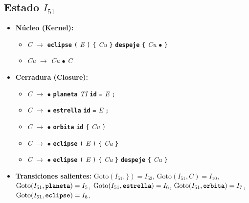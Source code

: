 \documentclass[12pt, letterpaper]{article}
\begin{document}
\subsection*{Estado $I_{51}$ }
\begin{itemize}\setlength{\itemsep}{1pt}\setlength{\parskip}{0pt}
\item \textbf{Núcleo (Kernel):}
\begin{itemize}\setlength{\itemsep}{1pt}\setlength{\parskip}{0pt}
    \item \textit{C} $\to$ \textbf{\texttt{eclipse}} \texttt{(} \textit{E} \texttt{)} \texttt{\{} \textit{Cu} \texttt{\}} \textbf{\texttt{despeje}} \texttt{\{} \textit{Cu} $\bullet$ \texttt{\}}
    \item \textit{Cu} $\to$ \textit{Cu} $\bullet$ \textit{C}
\end{itemize}
\item \textbf{Cerradura (Closure):}
\begin{itemize}\setlength{\itemsep}{1pt}\setlength{\parskip}{0pt}
    \item \textit{C} $\to$ $\bullet$ \textbf{\texttt{planeta}} \textit{TI} \textbf{\texttt{id}} \texttt{=} \textit{E} \texttt{;}
    \item \textit{C} $\to$ $\bullet$ \textbf{\texttt{estrella}} \textbf{\texttt{id}} \texttt{=} \textit{E} \texttt{;}
    \item \textit{C} $\to$ $\bullet$ \textbf{\texttt{orbita}} \textbf{\texttt{id}} \texttt{\{} \textit{Cu} \texttt{\}}
    \item \textit{C} $\to$ $\bullet$ \textbf{\texttt{eclipse}} \texttt{(} \textit{E} \texttt{)} \texttt{\{} \textit{Cu} \texttt{\}}
    \item \textit{C} $\to$ $\bullet$ \textbf{\texttt{eclipse}} \texttt{(} \textit{E} \texttt{)} \texttt{\{} \textit{Cu} \texttt{\}} \textbf{\texttt{despeje}} \texttt{\{} \textit{Cu} \texttt{\}}
\end{itemize}
\item \textbf{Transiciones salientes:} $\text{Goto}(I_{51}, \texttt{\}}) = I_{52}$, \quad $\text{Goto}(I_{51}, \textit{C}) = I_{10}$, \quad $\text{Goto}(I_{51}, \textbf{\texttt{planeta}}) = I_{5}$, \quad $\text{Goto}(I_{51}, \textbf{\texttt{estrella}}) = I_{6}$, \quad $\text{Goto}(I_{51}, \textbf{\texttt{orbita}}) = I_{7}$, \quad $\text{Goto}(I_{51}, \textbf{\texttt{eclipse}}) = I_{8}$.
\end{itemize}
\vspace{2pt}
\end{document}
